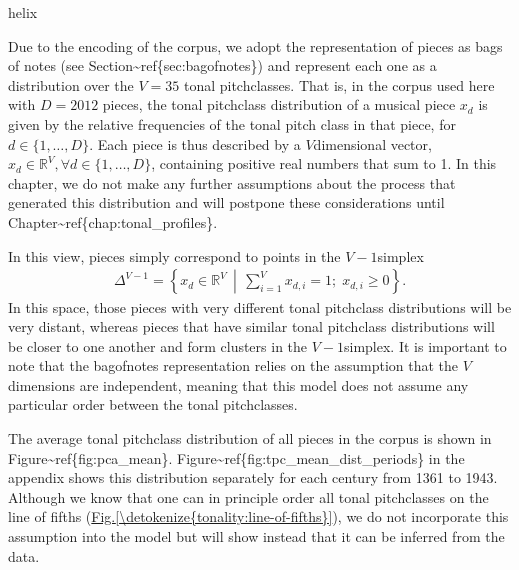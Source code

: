 \documentclass[letterpaper,10pt,english]{sphinxmanual}
\begin{document}
helix

Due to the encoding of the corpus, we adopt the
representation of pieces as bags of notes (see Section\textasciitilde{}ref\{sec:bagofnotes\})
and represent each one as a distribution over the \(V=35\) tonal pitch\sphinxhyphen{}classes.
That is, in the corpus used here with \(D=2012\) pieces, the tonal pitch\sphinxhyphen{}class distribution of a musical piece \(x_d\)
is given by the relative frequencies of the tonal pitch class in that piece, for \(d\in \{1,\ldots,D\}\).
Each piece is thus described by a \(V\)\sphinxhyphen{}dimensional vector, \(x_d \in \mathbb R^V, \forall d \in\{1,\ldots,D\}\),
containing positive real numbers that sum to 1.
In this chapter, we do not make any further assumptions about the process that generated
this distribution and will postpone these considerations until Chapter\textasciitilde{}ref\{chap:tonal\_profiles\}.

In this view, pieces simply correspond to points in the \(V - 1\)\sphinxhyphen{}simplex
\begin{equation*}
\begin{split}\Delta^{V-1} =       \left\{ x_d \in \mathbb{R}^V
\,\middle\vert\, \sum_{i=1}^V x_{d,i} = 1;\; x_{d,i}\geq 0 \right\}.\end{split}
\end{equation*}
In this space, those pieces with very different tonal pitch\sphinxhyphen{}class distributions will be very distant,
whereas pieces that have similar tonal pitch\sphinxhyphen{}class distributions will be closer to one another and form clusters
in the \(V-1\)\sphinxhyphen{}simplex.
It is important to note that the bag\sphinxhyphen{}of\sphinxhyphen{}notes representation relies on the assumption that the \(V\) dimensions are independent,
meaning that this model does not  assume any particular order between the tonal pitch\sphinxhyphen{}classes.

The average tonal pitch\sphinxhyphen{}class distribution of all pieces in the corpus is shown in Figure\textasciitilde{}ref\{fig:pca\_mean\}.
Figure\textasciitilde{}ref\{fig:tpc\_mean\_dist\_periods\} in the appendix shows this distribution separately
for each century from 1361 to 1943.
Although we know that one can in principle order all tonal pitch\sphinxhyphen{}classes on the line of fifths
(\hyperref[\detokenize{tonality:line-of-fifths}]{Fig.\@ \ref{\detokenize{tonality:line-of-fifths}}}), we do not incorporate this assumption into the model but
will show instead that it can be inferred from the data.
\end{document}
